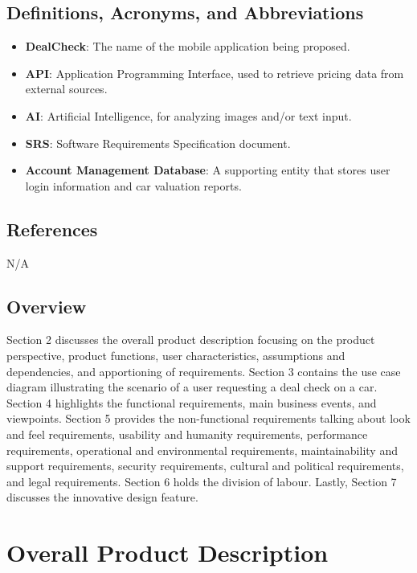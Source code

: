 \documentclass[]{article}
\begin{document}
\subsection{Definitions, Acronyms, and Abbreviations}
\label{sub:definitions_acronyms_and_abbreviations}
\begin{itemize}
    \item \textbf{DealCheck}: The name of the mobile application being proposed.
    \item \textbf{API}: Application Programming Interface, used to retrieve pricing data from external sources.
    \item \textbf{AI}: Artificial Intelligence, for analyzing images and/or text input.
    \item \textbf{SRS}: Software Requirements Specification document.
    \item \textbf{Account Management Database}: A supporting entity that stores user login information and car valuation reports.
\end{itemize}

\subsection{References}
\label{sub:references}
N/A

\subsection{Overview}
\label{sub:overview}
Section 2 discusses the overall product description focusing on the product perspective, product functions, user characteristics, assumptions and dependencies, and apportioning of requirements. Section 3 contains the use case diagram illustrating the scenario of a user requesting a deal check on a car. Section 4 highlights the functional requirements, main business events, and viewpoints. Section 5 provides the non-functional requirements talking about look and feel requirements, usability and humanity requirements, performance requirements, operational and environmental requirements, maintainability and support requirements, security requirements, cultural and political requirements, and legal requirements. Section 6 holds the division of labour. Lastly, Section 7 discusses the innovative design feature.

\newpage
\section{Overall Product Description}
\label{sec:overall_description}
\end{document}
